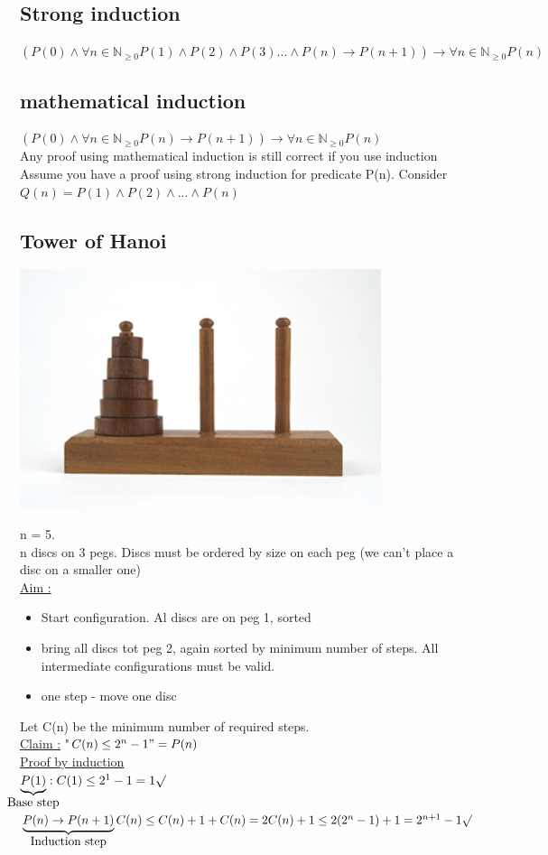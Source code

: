 \documentclass[12pt,a4paper]{article}
\begin{document}
\subsection{Strong induction}
$(P(0) \wedge \forall n \in \mathbb{N}_{\geq 0} P(1) \wedge P(2) \wedge P(3)...\wedge P(n) \to P(n+1)) \to \forall n \in \mathbb{N}_{\geq 0} P(n)$
\subsection{mathematical induction}
 $(P(0) \wedge \forall n \in \mathbb{N}_{\geq 0} P(n) \to P(n+1)) \to \forall n \in \mathbb{N}_{\geq 0} P(n)$\\
 Any proof using mathematical induction is still correct if you use induction\\
Assume you have a proof using strong induction for predicate P(n). Consider $Q(n) = P(1) \wedge P(2) \wedge...\wedge P(n)$
\subsection{Tower of Hanoi}
\begin{center}
\includegraphics[scale=0.8]{images/hanoi}
\end{center}
n = 5.\\
n discs on 3 pegs. Discs must be ordered by size on each peg (we can't place a disc on a smaller one)\\
\underline{Aim :} \begin{itemize}
\item Start configuration. Al discs are on  peg 1, sorted
\item bring all discs tot peg 2, again sorted by minimum number of steps. All intermediate configurations must be valid.
\item one step - move one disc
\end{itemize} 
Let C(n) be the minimum number of required steps.\\
\underline{Claim :} "$C(n) \leq 2^n-1" = P(n)$\\
\underline{Proof by induction}\\
 $\underbrace{P(1)}_{\mathclap{\mbox{Base step}}} : C(1) \leq 2^1-1=1 \surd$\\
$\underbrace{P(n) \to P(n+1)}_{\mathclap{\mbox{Induction step}}}\\
C(n) \leq C(n) +1+C(n) = 2C(n) +1 \leq 2(2^n-1)+1 = 2^{n+1}-1\surd$\\
\end{document}
